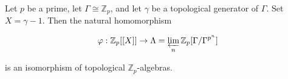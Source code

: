 Let $p$ be a prime, let $\Gamma \cong \mathbb{Z}_p$, and let $\gamma$ be a topological generator of $\Gamma$. Set $X = \gamma - 1$. Then the natural homomorphism

$$\varphi: \mathbb{Z}_p[[X]] \to \Lambda = \varprojlim_n \mathbb{Z}_p[\Gamma/\Gamma^{p^n}]$$

is an isomorphism of topological $\mathbb{Z}_p$-algebras.
